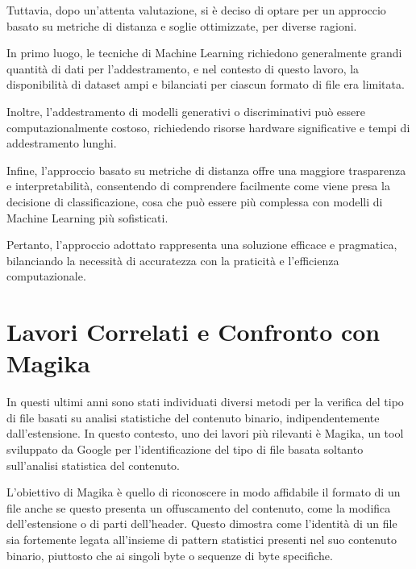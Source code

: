 \documentclass{report}
\begin{document}
Tuttavia, dopo un'attenta valutazione, si è deciso di optare per un approccio basato su metriche di distanza e soglie ottimizzate,
per diverse ragioni.

\bigskip

In primo luogo, le tecniche di Machine Learning richiedono generalmente grandi quantità di dati per l'addestramento,
e nel contesto di questo lavoro, la disponibilità di dataset ampi e bilanciati per ciascun formato di file era limitata.

\bigskip

Inoltre, l'addestramento di modelli generativi o discriminativi può essere computazionalmente costoso,
richiedendo risorse hardware significative e tempi di addestramento lunghi.

\bigskip

Infine, l'approccio basato su metriche di distanza offre una maggiore trasparenza e interpretabilità,
consentendo di comprendere facilmente come viene presa la decisione di classificazione,
cosa che può essere più complessa con modelli di Machine Learning più sofisticati.

\bigskip

Pertanto, l'approccio adottato rappresenta una soluzione efficace e pragmatica,
bilanciando la necessità di accuratezza con la praticità e l'efficienza computazionale.



\section{Lavori Correlati e Confronto con Magika}

In questi ultimi anni sono stati individuati diversi metodi per la verifica del tipo di file basati su analisi statistiche del 
contenuto binario, indipendentemente dall'estensione. In questo contesto, uno dei lavori più rilevanti è Magika,
un tool sviluppato da Google per l'identificazione del tipo di file basata soltanto sull'analisi statistica del contenuto.

\bigskip

L'obiettivo di Magika è quello di riconoscere in modo affidabile il formato di un file anche se questo 
presenta un offuscamento del contenuto, come la modifica dell’estensione o di parti dell’header.
Questo dimostra come l'identità di un file sia fortemente legata all'insieme di pattern statistici presenti nel suo contenuto binario,
piuttosto che ai singoli byte o sequenze di byte specifiche.
\end{document}
